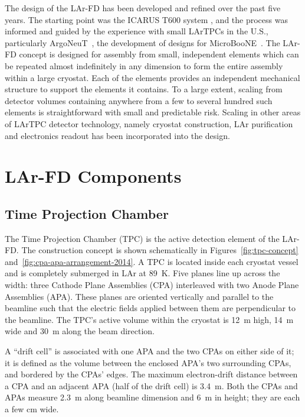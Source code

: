 The design of the LAr-FD has been developed and refined 
over the past five years. The starting point was the ICARUS  T600 system \cite{Icarus-T600}, 
and the process was informed and guided by the experience with small 
LArTPCs in the U.S., particularly ArgoNeuT~\cite{argoneut-url},  the development of designs 
for MicroBooNE~\cite{microboone-url}.
The LAr-FD concept is designed for assembly 
from small, independent elements  which can be repeated almost indefinitely
 in any dimension to form the entire 
assembly within a large cryostat. Each 
of the elements provides an independent mechanical structure 
to support the elements it contains.  To a large extent, scaling from 
detector volumes containing anywhere from a few to 
several hundred such elements is straightforward with small 
and predictable risk. Scaling in other areas of 
LArTPC detector technology, namely cryostat construction, LAr purification
and electronics readout has been incorporated into the design.


\section{LAr-FD Components}
\label{sec:larfd-components}

\subsection{Time Projection Chamber}

The Time Projection Chamber (TPC) is the active detection element of the LAr-FD. The construction concept is  shown schematically in Figures~\ref{fig:tpc-concept} and~\ref{fig:cpa-apa-arrangement-2014}.  A TPC is located
 inside each cryostat vessel and is completely submerged in LAr at 89~K. Five planes line up across the width: three Cathode Plane Assemblies (CPA)  
 interleaved with two Anode Plane Assemblies (APA). These planes are oriented vertically and 
 parallel to the beamline such that the electric fields applied between them are perpendicular to the beamline.  The TPC's active volume within the cryostat  is 12~m high, 14~m wide and 30~m along  
 the beam direction. 
 
 A ``drift cell'' is associated with one APA and the two CPAs on either 
 side of it; it is 
 defined as the volume between the enclosed APA's two surrounding CPAs, and bordered by the CPAs' edges.  The maximum electron-drift distance between a CPA and an adjacent APA (half 
 of the drift cell) is 3.4~m. Both the CPAs and APAs measure 2.3~m along beamline dimension and 6~m
 in height; they are each a few cm wide. 
 
